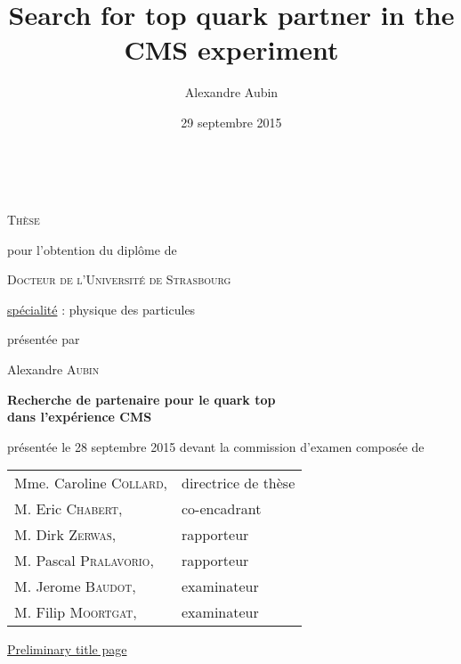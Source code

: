 


\title{Search for top quark partner in the CMS experiment}
\author{Alexandre Aubin}
\date{29 septembre 2015}

\begin{titlepage}
    \vspace*{1cm}
    \begin{center}
        \\

        \vspace*{0.8cm}

        {\Large \textsc{Thèse}}

        \vspace*{0.8cm}

        pour l'obtention du diplôme de

        \vspace*{0.8cm}

        {\Large \textsc{Docteur de l'Université de Strasbourg}}

        \vspace*{0.8cm}

        \underline{spécialité} : physique des particules

        \vspace*{0.8cm}

        présentée par

        Alexandre \textsc{Aubin}

        \vspace*{0.8cm}

        {\Large \textbf{Recherche de partenaire pour le quark top\\ dans l'expérience CMS}}

        \vspace*{0.8cm}

        présentée le 28 septembre 2015 devant la commission d'examen composée de

        \vspace*{0.8cm}

        \begin{tabular}{ll}
            Mme. Caroline \textsc{Collard}, & directrice de thèse\\
            M. Eric \textsc{Chabert},       & co-encadrant\\
            M. Dirk \textsc{Zerwas},        & rapporteur\\
            M. Pascal \textsc{Pralavorio},  & rapporteur\\
            M. Jerome \textsc{Baudot},      & examinateur\\
            M. Filip \textsc{Moortgat},     & examinateur\\
        \end{tabular}

        \vspace*{0.5cm}

        \underline{\Huge{Preliminary title page}}

    \end{center}
    \vspace*{1cm}
\end{titlepage}
\restoregeometry
